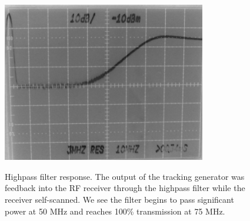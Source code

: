\begin{figure}
\begin{center}
\leavevmode
\includegraphics[width=3.5in]
{highpass/highpass.png}\\
\end{center}
\caption[Highpass filter response]{Highpass filter response. The output of the tracking generator was feedback into the RF receiver through the highpass filter while the receiver self-scanned. We see the filter begins to pass significant power at 50 MHz and reaches 100\% transmission at 75 MHz.}
\label{highpass}
\end{figure}
